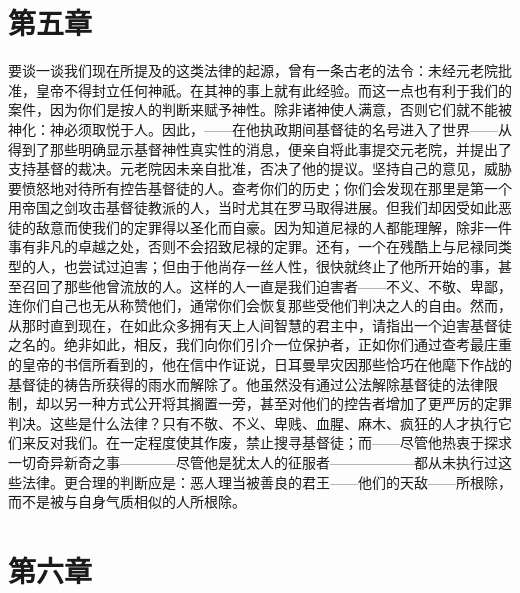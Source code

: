 
\section{第五章}

要谈一谈我们现在所提及的这类法律的起源，曾有一条古老的法令：未经元老院批准，皇帝不得封立任何神祇。在其神的事上就有此经验。而这一点也有利于我们的案件，因为你们是按人的判断来赋予神性。除非诸神使人满意，否则它们就不能被神化：神必须取悦于人。因此，——在他执政期间基督徒的名号进入了世界——从得到了那些明确显示基督神性真实性的消息，便亲自将此事提交元老院，并提出了支持基督的裁决。元老院因未亲自批准，否决了他的提议。坚持自己的意见，威胁要愤怒地对待所有控告基督徒的人。查考你们的历史；你们会发现在那里是第一个用帝国之剑攻击基督徒教派的人，当时尤其在罗马取得进展。但我们却因受如此恶徒的敌意而使我们的定罪得以圣化而自豪。因为知道尼禄的人都能理解，除非一件事有非凡的卓越之处，否则不会招致尼禄的定罪。还有，一个在残酷上与尼禄同类型的人，也尝试过迫害；但由于他尚存一丝人性，很快就终止了他所开始的事，甚至召回了那些他曾流放的人。这样的人一直是我们迫害者——不义、不敬、卑鄙，连你们自己也无从称赞他们，通常你们会恢复那些受他们判决之人的自由。然而，从那时直到现在，在如此众多拥有天上人间智慧的君主中，请指出一个迫害基督徒之名的。绝非如此，相反，我们向你们引介一位保护者，正如你们通过查考最庄重的皇帝的书信所看到的，他在信中作证说，日耳曼旱灾因那些恰巧在他麾下作战的基督徒的祷告所获得的雨水而解除了。他虽然没有通过公法解除基督徒的法律限制，却以另一种方式公开将其搁置一旁，甚至对他们的控告者增加了更严厉的定罪判决。这些是什么法律？只有不敬、不义、卑贱、血腥、麻木、疯狂的人才执行它们来反对我们。在一定程度使其作废，禁止搜寻基督徒；而——尽管他热衷于探求一切奇异新奇之事————尽管他是犹太人的征服者——————都从未执行过这些法律。更合理的判断应是：恶人理当被善良的君王——他们的天敌——所根除，而不是被与自身气质相似的人所根除。\par


\section{第六章}

